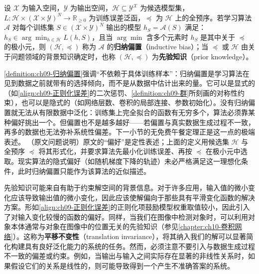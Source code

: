 \documentclass[../../main.tex]{subfiles}
\begin{document}
\begin{definition}[归纳偏置]\label{definition:ch09-归纳偏置}
设 $\mathcal{X}$ 为输入空间，$\mathcal{Y}$ 为输出空间，$\mathcal{H}\subseteq\mathcal{Y}^{\mathcal{X}}$ 为候选模型集，$L:\mathcal{H}\times(\mathcal{X}\times\mathcal{Y})^{N}\to\mathbb{R}_{\geqslant0}$ 为训练误差泛函，$\preceq$ 为 $\mathcal{H}$ 上的全预序。若学习算法 $\mathcal{A}$ 对每个训练集 $S\in(\mathcal{X}\times\mathcal{Y})^{N}$ 输出的模型 $h_{S}=\mathcal{A}(S)$ 满足：$h_{S}\in\arg\min_{h\in\mathcal{H}}L(h,S)$，且当 $\arg\min$ 含多个元素时 $h_{S}$ 是其中关于 $\preceq$ 的极小元，则 $(\mathcal{H},\preceq)$ 称为 $\mathcal{A}$ 的\textbf{归纳偏置}（inductive bias）；当 $\preceq$ 或 $\mathcal{H}$ 由关于问题领域的背景知识确定时，也称 $(\mathcal{H},\preceq)$ 为\textbf{先验知识}（prior knowledge）。
\end{definition}

\begin{remark}\cref{definition:ch09-归纳偏置}强调“不依赖于具体训练样本”：归纳偏置是学习算法在见到数据之前就带有的选择倾向，而不是从数据中估计出来的量。它可以是显式的（如\eqref{align:ch09-正则化误差}的二次惩罚、\cref{definition:ch09-群}所刻画的对称性约束），也可以是隐式的（如网络层数、卷积的局部连接、参数初始化）。没有归纳偏置就无法从有限数据中泛化：训练集上完全拟合的函数有无穷多个，算法必须靠某种偏好挑出一个。但偏置也不是越多越好——若偏置与真实数据生成过程不一致，再多的数据也无法弥补系统性偏差。下一小节的无免费午餐定理正是这一点的极端表述。
（原文问题说明）原文的“偏好”是定性表述；上面的定义用候选集 $\mathcal{H}$ 与全预序 $\preceq$ 将其形式化，并要求算法先最小化训练误差、再按 $\preceq$ 在极小元中选取。现实算法的隐式偏好（如随机梯度下降的轨迹）未必严格满足这一理想化条件，此时归纳偏置只能作为该算法的近似描述。
\end{remark}

先验知识可能来自有助于约束解空间的背景信息。对于许多应用，输入值的微小变化应该导致输出值的微小变化，因此应该使解偏向于那些具有平滑变化函数的解决方案。形如\eqref{align:ch09-正则化误差}的正则化项鼓励模型权重取值较小，因此引入了对输入变化较慢的函数的偏好。同样，当我们在图像中检测对象时，可以利用对象本体通常与对象在图像中的位置无关的先验知识（参见\cref{chapter:ch10-卷积网络}）。这称为\textbf{平移不变性}（translation invariance），将其纳入我们的解可以显著简化构建具有良好泛化能力的系统的任务。然而，必须注意不要引入与数据生成过程不一致的偏差或约束。例如，当输出与输入之间实际存在显著的非线性关系时，如果假设它们的关系是线性的，则可能导致得到一个产生不准确答案的系统。
\end{document}
